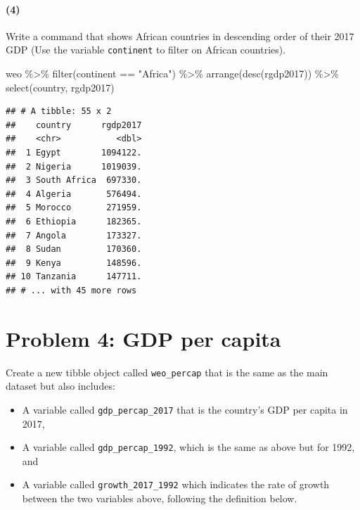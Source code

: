 \documentclass[11pt]{article}
\providecommand{\tightlist}{%
  \setlength{\itemsep}{0pt}\setlength{\parskip}{0pt}}
\newenvironment{Shaded}{\begin{snugshade}}{\end{snugshade}}
\newcommand{\FunctionTok}[1]{\textcolor[rgb]{0.00,0.00,0.00}{#1}}
\newcommand{\NormalTok}[1]{#1}
\newcommand{\SpecialCharTok}[1]{\textcolor[rgb]{0.00,0.00,0.00}{#1}}
\newcommand{\StringTok}[1]{\textcolor[rgb]{0.31,0.60,0.02}{#1}}
\begin{document}
\paragraph{(4)}

Write a command that shows African countries in descending order of
their 2017 GDP (Use the variable \texttt{continent} to filter on African
countries).

\begin{Shaded}
\begin{Highlighting}[]
\NormalTok{weo }\SpecialCharTok{\%\textgreater{}\%}
  \FunctionTok{filter}\NormalTok{(continent }\SpecialCharTok{==} \StringTok{"Africa"}\NormalTok{) }\SpecialCharTok{\%\textgreater{}\%}
  \FunctionTok{arrange}\NormalTok{(}\FunctionTok{desc}\NormalTok{(rgdp2017)) }\SpecialCharTok{\%\textgreater{}\%}
  \FunctionTok{select}\NormalTok{(country, rgdp2017)}
\end{Highlighting}
\end{Shaded}

\begin{verbatim}
## # A tibble: 55 x 2
##    country      rgdp2017
##    <chr>           <dbl>
##  1 Egypt        1094122.
##  2 Nigeria      1019039.
##  3 South Africa  697330.
##  4 Algeria       576494.
##  5 Morocco       271959.
##  6 Ethiopia      182365.
##  7 Angola        173327.
##  8 Sudan         170360.
##  9 Kenya         148596.
## 10 Tanzania      147711.
## # ... with 45 more rows
\end{verbatim}

\hypertarget{problem-4-gdp-per-capita}{%
\section*{Problem 4: GDP per capita}\label{problem-4-gdp-per-capita}}

Create a new tibble object called \texttt{weo\_percap} that is the same
as the main dataset but also includes:

\begin{itemize}
\tightlist
\item
  A variable called \texttt{gdp\_percap\_2017} that is the country's GDP
  per capita in 2017,
\item
  A variable called \texttt{gdp\_percap\_1992}, which is the same as
  above but for 1992, and
\item
  A variable called \texttt{growth\_2017\_1992} which indicates the rate
  of growth between the two variables above, following the definition
  below.
\end{itemize}
\end{document}
